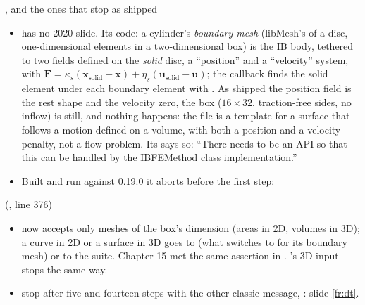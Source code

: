 \documentclass[aspectratio=169,11pt]{beamer}
\begin{document}
\begin{frame}{, and the ones that stop as shipped}
\label{fr:fail}
\footnotesize
\begin{itemize}
  \item {} has no 2020 slide. Its code: a cylinder's \emph{boundary mesh} (libMesh's  of a disc, one-dimensional elements in a two-dimensional box) is the IB body, tethered to two fields defined on the \emph{solid} disc, a ``position'' and a ``velocity'' system, with $\mathbf{F} = \kappa_s(\mathbf{x}_{\mathrm{solid}} - \mathbf{x}) + \eta_s(\mathbf{u}_{\mathrm{solid}} - \mathbf{u})$; the callback finds the solid element under each boundary element with . As shipped the position field is the rest shape and the velocity zero, the box ($16\times32$, traction-free sides, no inflow) is still, and nothing happens: the file is a template for a surface that follows a motion defined on a volume, with both a position and a velocity penalty, not a flow problem. Its  says so: ``There needs to be an API so that this can be handled by the IBFEMethod class implementation.''
  \item {} Built and run against 0.19.0 it aborts before the first step:
\end{itemize}
\begin{center}\scriptsize{} \quad (, line 376)\end{center}
\begin{itemize}
  \item {} now accepts only meshes of the box's dimension (areas in 2D, volumes in 3D); a curve in 2D or a surface in 3D goes to  (what  switches to for its boundary mesh) or to the  suite. Chapter 15 met the same assertion in . 's 3D input stops the same way.
  \item {} stop after five and fourteen steps with the other classic message, : slide \ref{fr:dt}.
\end{itemize}
\end{frame}
\end{document}
